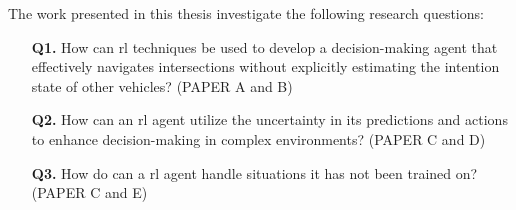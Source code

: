 
The work presented in this thesis investigate the following research questions:
\begin{enumerate}
	\item[\textbf{Q1.}] How can \gls{rl} techniques be used to develop a decision-making agent that effectively navigates intersections without explicitly estimating the intention state of other vehicles? (PAPER A and B)
	\item[\textbf{Q2.}] How can an \gls{rl} agent utilize the uncertainty in its predictions and actions to enhance decision-making in complex environments? (PAPER C and D)
	\item[\textbf{Q3.}] How do can a \gls{rl} agent handle situations it has not been trained on? (PAPER C and E)
	
\end{enumerate}

